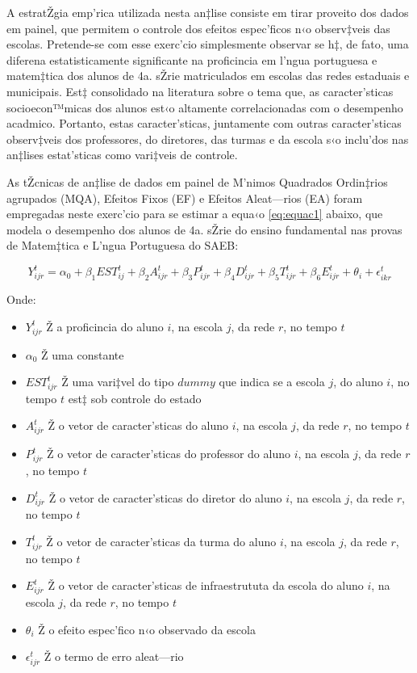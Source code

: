 \documentclass[a4paper, 12pt]{article}
\begin{document}
A estratŽgia emp’rica utilizada nesta an‡lise consiste em tirar proveito dos dados em painel, que permitem o controle dos efeitos espec’ficos n‹o observ‡veis das escolas. Pretende-se com esse exerc’cio simplesmente observar se h‡, de fato, uma diferena estatisticamente significante na proficincia em l’ngua portuguesa e matem‡tica dos alunos de 4a. sŽrie matriculados em escolas das redes estaduais e municipais. Est‡ consolidado na literatura sobre o tema \cite{glewwe_chapter_2006} \cite{hanushek_school_1996} que, as caracter’sticas socioecon™micas dos alunos est‹o altamente correlacionadas com o desempenho acadmico. Portanto, estas caracter’sticas, juntamente com outras caracter’sticas observ‡veis dos professores, do diretores, das turmas e da escola s‹o inclu’dos nas an‡lises estat’sticas como vari‡veis de controle. 

As tŽcnicas de an‡lise de dados em painel de M’nimos Quadrados Ordin‡rios agrupados (MQA), Efeitos Fixos (EF) e Efeitos Aleat—rios (EA) foram empregadas neste exerc’cio para se estimar a equa‹o \ref{eq:equac1}  abaixo, que modela o desempenho dos alunos de 4a. sŽrie do ensino fundamental nas provas de Matem‡tica e L’ngua Portuguesa do SAEB:

\begin{equation}
 Y_{ijr}^{t} = \alpha_0 + \beta_1 EST_{ij}^{t}  + \beta_2 A_{ijr}^{t} + \beta_3 P_{ijr}^{t} + \beta_4 D_{ijr}^{t} + \beta_5 T_{ijr}^{t} + \beta_6 E_{ijr}^{t} +  \theta_{i}  + \epsilon_{ikr}^{t} \label{eq:equac1}
\end{equation}

Onde:
\begin{itemize}
\item $Y_{ijr}^{t}$ Ž a proficincia do aluno $i$, na escola $j$, da rede $r$, no tempo $t$
\item$\alpha_0$ Ž uma constante
\item$EST_{ijr}^{t}$ Ž uma vari‡vel do tipo $dummy$ que indica se a escola $j$, do aluno $i$,  no tempo $t$ est‡ sob controle do estado
\item$A_{ijr}^{t}$ Ž o vetor de caracter’sticas do aluno $i$, na escola $j$, da rede $r$, no tempo $t$
\item$P_{ijr}^{t}$ Ž o vetor de caracter’sticas do professor do aluno $i$, na escola $j$, da rede $r$, no tempo $t$
\item$D_{ijr}^{t}$ Ž o vetor de caracter’sticas do diretor do aluno $i$, na escola $j$, da rede $r$, no tempo $t$
\item$T_{ijr}^{t}$ Ž o vetor de caracter’sticas da turma do aluno $i$, na escola $j$, da rede $r$, no tempo $t$
\item$E_{ijr}^{t}$ Ž o vetor de caracter’sticas de infraestrututa da escola do aluno $i$, na escola $j$, da rede $r$, no tempo $t$
\item$\theta_{i}$ Ž o efeito espec’fico n‹o observado da escola
\item$\epsilon_{ijr}^{t}$ Ž o termo de erro aleat—rio 
\end{itemize}
\end{document}
